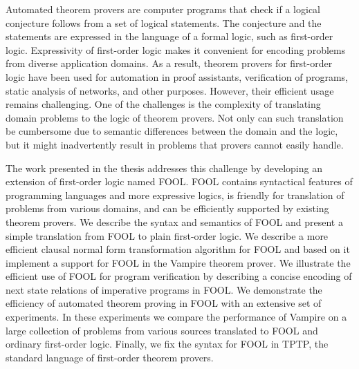 Automated theorem provers are computer programs that check if a logical conjecture follows from a set of logical statements. The conjecture and the statements are expressed in the language of a formal logic, such as first-order logic. Expressivity of first-order logic makes it convenient for encoding problems from diverse application domains. As a result, theorem provers for first-order logic have been used for automation in proof assistants, verification of programs, static analysis of networks, and other purposes. However, their efficient usage remains challenging. One of the challenges is the complexity of translating domain problems to the logic of theorem provers. Not only can such translation be cumbersome due to semantic differences between the domain and the logic, but it might inadvertently result in problems that provers cannot easily handle.

The work presented in the thesis addresses this challenge by developing an extension of first-order logic named FOOL. FOOL contains syntactical features of programming languages and more expressive logics, is friendly for translation of problems from various domains, and can be efficiently supported by existing theorem provers. We describe the syntax and semantics of FOOL and present a simple translation from FOOL to plain first-order logic. We describe a more efficient clausal normal form transformation algorithm for FOOL and based on it implement a support for FOOL in the Vampire theorem prover. We illustrate the efficient use of FOOL for program verification by describing a concise encoding of next state relations of imperative programs in FOOL. We demonstrate the efficiency of automated theorem proving in FOOL with an extensive set of experiments. In these experiments we compare the performance of Vampire on a large collection of problems from various sources translated to FOOL and ordinary first-order logic. Finally, we fix the syntax for FOOL in TPTP, the standard language of first-order theorem provers.